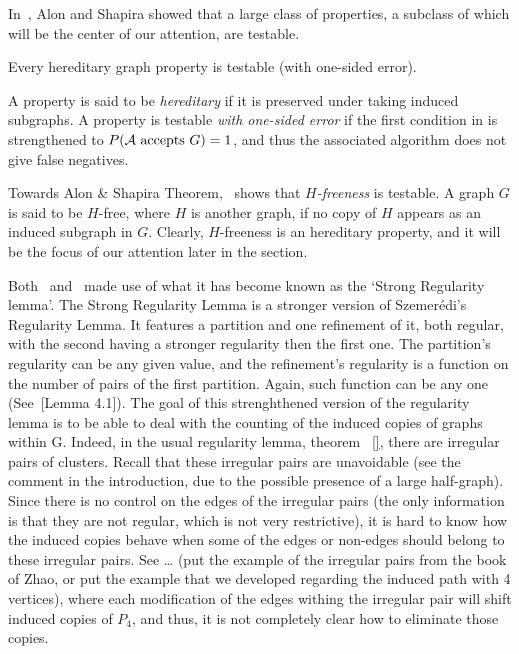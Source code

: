     In~\cite{a_characterization_of_the_natural_graph_properties_testable_with_one_sided_error}, Alon and Shapira
    showed that a large class of properties, a subclass of which will be the center of our attention, are testable.

    \begin{theorem}
        \label{thm:alon_and_shapira_theorem}
        Every hereditary graph property is testable (with one-sided error).
    \end{theorem}

    A property is said to be \emph{hereditary} if it is preserved under taking induced subgraphs.
    A property is testable \emph{with one-sided error} if the first condition in 
    is strengthened to $P( \mathcal{A} \text{ accepts } G ) = 1$, and thus the associated algorithm does
    not give false negatives.

    Towards Alon \& Shapira Theorem,~\cite{efficient_testing_of_large_graphs} shows that \emph{$H$-freeness} is testable.
    A graph $G$ is said to be $H$-free, where $H$ is another graph, if no copy of $H$ appears as an induced subgraph in $G$.
    Clearly, $H$-freeness is an hereditary property, and it will be the focus of our attention later in the section.

    Both~\cite{} and~\cite{} made use of what it has become known as the ‘Strong Regularity lemma’.
    The Strong Regularity Lemma is a stronger version of Szemer\'edi's Regularity Lemma.
    It features a partition and one refinement of it, both regular, with the second having a stronger regularity then
    the first one.
    The partition's regularity can be any given value, and the refinement's regularity is a function
    on the number of pairs of the first partition.
    Again, such function can be any  one (See~\cite{efficient_testing_of_large_graphs}[Lemma 4.1]).
    The goal of this strenghthened version of the regularity lemma is to be able to deal with the counting of the
    induced copies of graphs within G. Indeed, in the usual regularity lemma, theorem ~\ref{}, there are irregular
    pairs of clusters.
    Recall that these irregular pairs are unavoidable (see the comment in the introduction, due to the possible presence
    of a large half-graph).
    Since there is no control on the edges of the irregular pairs (the only information is that they are not regular,
    which is not very restrictive), it is hard to know how the induced copies behave when some of the edges or non-edges
    should belong to these irregular pairs.
    See … (put the example of the irregular pairs from the book of Zhao, or put the example that we developed regarding
    the induced path with 4 vertices), where each modification of the edges withing the irregular pair will shift
    induced copies of $P_4$, and thus, it is not completely clear how to eliminate those copies.

